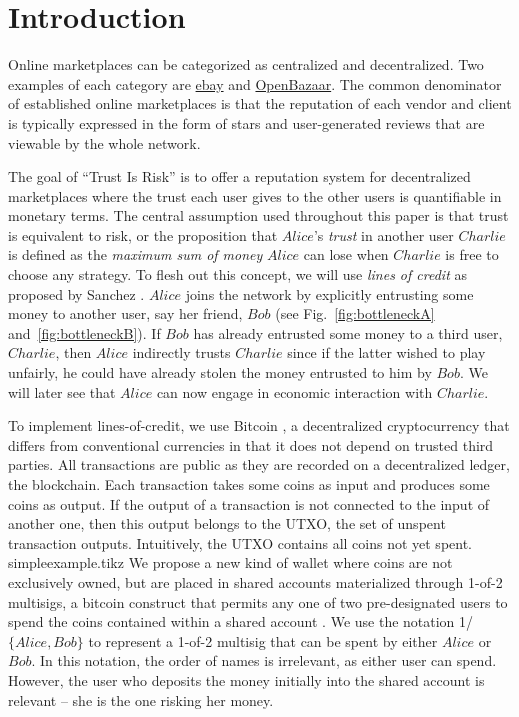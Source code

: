 \section{Introduction}
  Online marketplaces can be categorized as centralized and decentralized.
  Two examples of each category are \href{http://www.ebay.com}{ebay} and \href{https://openbazaar.org/}{OpenBazaar}.
  The common denominator of established online marketplaces is that the reputation of each vendor and client is typically
  expressed in the form of stars and user-generated reviews that are viewable by the whole network.

  The goal of ``Trust Is Risk'' is to offer a reputation system for decentralized marketplaces where the trust each user gives
  to the other users is quantifiable in monetary terms. The central assumption used throughout this paper is that trust is
  equivalent to risk, or the proposition that $Alice$'s \textit{trust} in another user $Charlie$ is defined as the
  \textit{maximum sum of money} $Alice$ can lose when $Charlie$ is free to choose any strategy. To flesh out this concept, we
  will use \textit{lines of credit} as proposed by Sanchez \cite{loc}. $Alice$ joins the network by explicitly entrusting some
  money to another user, say her friend, $Bob$ (see Fig.~\ref{fig:bottleneckA} and~\ref{fig:bottleneckB}). If $Bob$ has
  already entrusted some money to a third user, $Charlie$, then $Alice$ indirectly trusts $Charlie$ since if the latter wished
  to play unfairly, he could have already stolen the money entrusted to him by $Bob$. We will later see that $Alice$ can now
  engage in economic interaction with $Charlie$.

  To implement lines-of-credit, we use Bitcoin \cite{bitcoin}, a decentralized cryptocurrency that differs from conventional
  currencies in that it does not depend on trusted third parties. All transactions are public as they are recorded on a
  decentralized ledger, the blockchain. Each transaction takes some coins as input and produces some coins as output. If the
  output of a transaction is not connected to the input of another one, then this output belongs to the UTXO, the set of
  unspent transaction outputs. Intuitively, the UTXO contains all coins not yet spent.
  {simpleexample.tikz}
  \noindent We propose a new kind of wallet where coins are not exclusively owned, but are placed in shared accounts materialized
  through 1-of-2 multisigs, a bitcoin construct that permits any one of two pre-designated users to spend the coins contained
  within a shared account \cite{masteringbitcoin}. We use the notation 1/$\{Alice, Bob\}$ to represent a 1-of-2 multisig that
  can be spent by either $Alice$ or $Bob$. In this notation, the order of names is irrelevant, as either user can spend.
  However, the user who deposits the money initially into the shared account is relevant -- she is the one risking her money.

